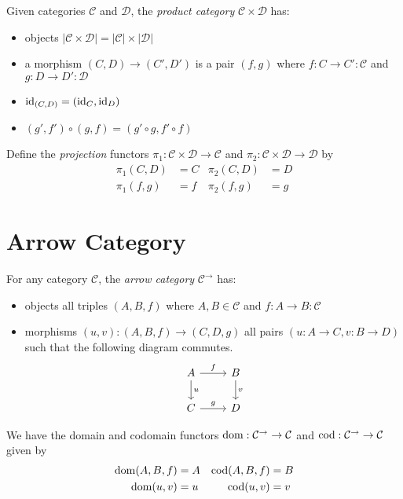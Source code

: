 \begin{df}
Given categories $\mathcal{C}$ and $\mathcal{D}$, the \emph{product category} $\mathcal{C} \times \mathcal{D}$ has:
\begin{itemize}
\item objects $|\mathcal{C} \times \mathcal{D}| = |\mathcal{C}| \times |\mathcal{D}|$
\item a morphism $(C,D) \rightarrow (C',D')$ is a pair $(f,g)$ where $f : C \rightarrow C' : \mathcal{C}$ and $g : D \rightarrow D' : \mathcal{D}$
\item $\mathrm{id}_{(C,D)} = (\mathrm{id}_{C},\mathrm{id}_{D})$
\item $(g',f') \circ (g,f) = (g' \circ g, f' \circ f)$
\end{itemize}

Define the \emph{projection} functors $\pi_1 : \mathcal{C} \times \mathcal{D} \rightarrow \mathcal{C}$ and $\pi_2 : \mathcal{C} \times \mathcal{D} \rightarrow \mathcal{D}$ by
\begin{align*}
\pi_1(C,D) & = C & \pi_2(C,D) & = D \\
\pi_1(f,g) & = f & \pi_2(f,g) & = g
\end{align*}
\end{df}

\section{Arrow Category}

\begin{df}
For any category $\mathcal{C}$, the \emph{arrow category} $\mathcal{C}^\rightarrow$ has:
\begin{itemize}
\item objects all triples $(A,B,f)$ where $A,B \in \mathcal{C}$ and $f : A \rightarrow B : \mathcal{C}$
\item morphisms $(u,v) : (A,B,f) \rightarrow (C,D,g)$ all pairs $(u : A \rightarrow C, v : B \rightarrow D)$ such that the following diagram commutes.
\[ \begin{tikzcd}
A \arrow[r,"f"] \arrow[d,"u"] & B \arrow[d,"v"] \\
C \arrow[r,"g"] & D
\end{tikzcd} \]
\end{itemize}

We have the domain and codomain functors $\operatorname{dom} : \mathcal{C}^\rightarrow \rightarrow \mathcal{C}$ and $\operatorname{cod} : \mathcal{C}^\rightarrow \rightarrow \mathcal{C}$ given by
\begin{align*}
\operatorname{dom} (A,B,f) & = A & \operatorname{cod} (A,B,f) & = B \\
\operatorname{dom}(u,v) & = u & \operatorname{cod} (u,v) & = v
\end{align*}
\end{df}

